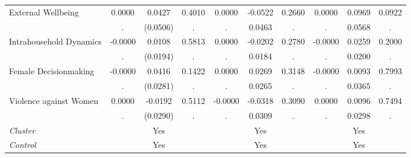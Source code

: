 \begin{tabular}{l*{9}{c}}
External Wellbeing & 0.0000 & 0.0427 & 0.4010 & 0.0000 & -0.0522 & 0.2660 & 0.0000 & 0.0969 & 0.0922 \\
  & . & (0.0506) & . & . & 0.0463 & . & . & 0.0568 & . \\
Intrahousehold Dynamics & -0.0000 & 0.0108 & 0.5813 & 0.0000 & -0.0202 & 0.2780 & -0.0000 & 0.0259 & 0.2000 \\
  & . & (0.0194) & . & . & 0.0184 & . & . & 0.0200 & . \\
Female Decisionmaking & -0.0000 & 0.0416 & 0.1422 & 0.0000 & 0.0269 & 0.3148 & -0.0000 & 0.0093 & 0.7993 \\
  & . & (0.0281) & . & . & 0.0265 & . & . & 0.0365 & . \\
Violence against Women & 0.0000 & -0.0192 & 0.5112 & -0.0000 & -0.0318 & 0.3090 & 0.0000 & 0.0096 & 0.7494 \\
  & . & (0.0290) & . & . & 0.0309 & . & . & 0.0298 & . \\
\hline \textit{Cluster} & & Yes &  & & Yes &  & & Yes &  \\ \textit{Control} & & Yes &  & & Yes &  & & Yes &   \\ \hline \end{tabular}
